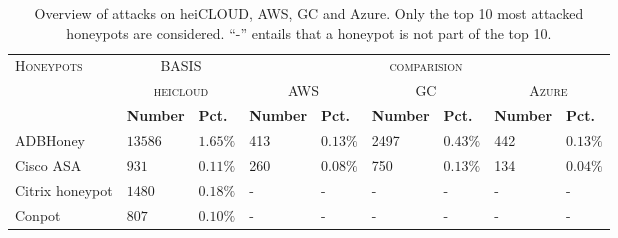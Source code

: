 \begin{table}
    \centering
    \caption[Overview of attacks on cloud providers]{Overview of attacks on heiCLOUD, AWS, GC and Azure. Only the top 10 most attacked honeypots are considered. \enquote{-} entails that a honeypot is not part of the top 10.}
    \begin{tabularx}{\linewidth}{l|XX|XX|XX|XX}
        \toprule
        \textsc{Honeypots}                        & \multicolumn{2}{c}{BASIS}             & \multicolumn{6}{c}{\textsc{comparision}}                                                                                                                                             \\
                                                  & \multicolumn{2}{c|}{\textsc{heicloud}} & \multicolumn{2}{c|}{\textsc{AWS}}        & \multicolumn{2}{c|}{\textsc{GC}} & \multicolumn{2}{c}{\textsc{Azure}}                                                                     \\
                                                  & \textbf{Number}                        & \textbf{Pct.}                            & \textbf{Number}                  & \textbf{Pct.}                      & \textbf{Number} & \textbf{Pct.} & \textbf{Number} & \textbf{Pct.} \\
        \hline
        ADBHoney \cite{adbhoney2021}              & $13586$                                & $1.65\%$                                 & 413                              & $0.13\%$                           & 2497            & $0.43\%$      & 442             & $0.13\%$      \\
        Cisco ASA \cite{cymmetria2018}            & $931$                                  & $0.11\%$                                 & 260                              & $0.08\%$                           & 750             & $0.13\%$      & 134             & $0.04\%$      \\
        Citrix honeypot \cite{citrixhoneypot2020} & $1480$                                 & $0.18\%$                                 & -                                & -                                  & -               & -             & -               & -             \\
        Conpot \cite{conpot2021}                  & $807$                                  & $0.10\%$                                 & -                                & -                                  & -               & -             & -               & -             \\

\end{tabularx}
\end{table}
